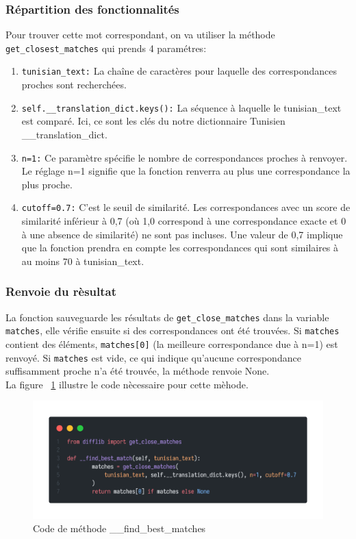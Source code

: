 \subsubsection{Répartition des fonctionnalités}
\noindent
Pour trouver cette mot correspondant, on va utiliser la méthode \\
\texttt{get\_closest\_matches} qui prends 4 paramétres:
\begin{enumerate}
	\item \texttt{tunisian\_text:} La chaîne de caractères pour laquelle des correspondances proches sont recherchées.
	\item \texttt{self.\_\_translation\_dict.keys():} La séquence à laquelle le tunisian\_text est comparé. Ici, ce sont les clés du notre dictionnaire Tunisien \_\_translation\_dict.
	\item \texttt{n=1:} Ce paramètre spécifie le nombre de correspondances proches à renvoyer. Le réglage n=1 signifie que la fonction renverra au plus une correspondance la plus proche.
	\item \texttt{cutoff=0.7:} C'est le seuil de similarité. Les correspondances avec un score de similarité inférieur à 0,7 (où 1,0 correspond à une correspondance exacte et 0 à une absence de similarité) ne sont pas incluses. Une valeur de 0,7 implique que la fonction prendra en compte les correspondances qui sont similaires à au moins 70 à tunisian\_text.
\end{enumerate}

\subsubsection{Renvoie du rèsultat}
\noindent
La fonction sauveguarde les résultats de \texttt{get\_close\_matches} dans la variable \texttt{matches}, elle vérifie ensuite si des correspondances ont été trouvées. Si \texttt{matches} contient des éléments, \texttt{matches[0]} (la meilleure correspondance due à n=1) est renvoyé. Si \texttt{matches} est vide, ce qui indique qu'aucune correspondance suffisamment proche n'a été trouvée, la méthode renvoie None.\\ La figure ~\ref{fig:findbestmatch} illustre le code nècessaire pour cette mèhode.

\begin{figure}[H]
	\centering
	\includegraphics[width=1\textwidth]{logos/findbestmatch.png}
	\caption{Code de méthode \_\_find\_best\_matches}
	\label{fig:findbestmatch}
\end{figure}

